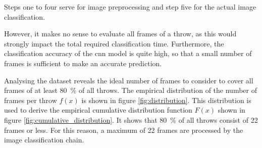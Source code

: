 Steps one to four serve for image preprocessing and step five for the actual image classification.

However, it makes no sense to evaluate all frames of a throw, as this would strongly impact the total required classification time.
Furthermore, the classification accuracy of the \acrshort{cnn} model is quite high, so that a small number of frames is sufficient to make an accurate prediction.

Analysing the dataset reveals the ideal number of frames to consider to cover all frames of at least \SI{80}{\percent} of all throws.
The empirical distribution of the number of frames per throw $f(x)$ is shown in figure \ref{fig:distribution}.
This distribution is used to derive the empirical cumulative distribution function $F(x)$ shown in figure \ref{fig:cumulative_distribution}.
It shows that \SI{80}{\percent} of all throws consist of \num{22} frames or less.
For this reason, a maximum of \num{22} frames are processed by the image classification chain.

